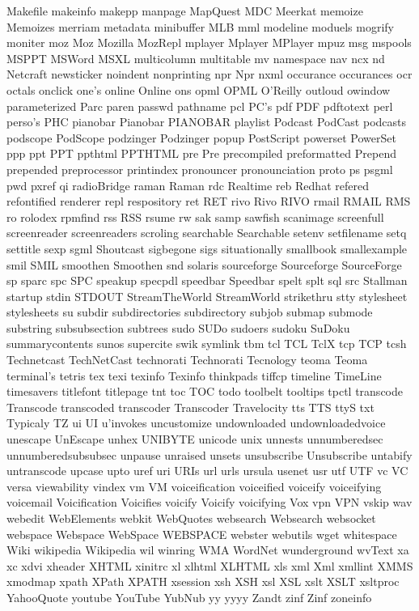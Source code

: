 Makefile
makeinfo
makepp
manpage
MapQuest
MDC
Meerkat
memoize
Memoizes
merriam
metadata
minibuffer
MLB
mml
modeline
moduels
mogrify
moniter
moz
Moz
Mozilla
MozRepl
mplayer
Mplayer
MPlayer
mpuz
msg
mspools
MSPPT
MSWord
MSXL
multicolumn
multitable
mv
namespace
nav
ncx
nd
Netcraft
newsticker
noindent
nonprinting
npr
Npr
nxml
occurance
occurances
ocr
octals
onclick
one's
online
Online
ons
opml
OPML
O'Reilly
outloud
owindow
parameterized
Parc
paren
passwd
pathname
pcl
PC's
pdf
PDF
pdftotext
perl
perso's
PHC
pianobar
Pianobar
PIANOBAR
playlist
Podcast
PodCast
podcasts
podscope
PodScope
podzinger
Podzinger
popup
PostScript
powerset
PowerSet
ppp
ppt
PPT
ppthtml
PPTHTML
pre
Pre
precompiled
preformatted
Prepend
prepended
preprocessor
printindex
pronouncer
pronounciation
proto
ps
psgml
pwd
pxref
qi
radioBridge
raman
Raman
rdc
Realtime
reb
Redhat
refered
refontified
renderer
repl
respository
ret
RET
rivo
Rivo
RIVO
rmail
RMAIL
RMS
ro
rolodex
rpmfind
rss
RSS
rsume
rw
sak
samp
sawfish
scanimage
screenfull
screenreader
screenreaders
scroling
searchable
Searchable
setenv
setfilename
setq
settitle
sexp
sgml
Shoutcast
sigbegone
sigs
situationally
smallbook
smallexample
smil
SMIL
smoothen
Smoothen
snd
solaris
sourceforge
Sourceforge
SourceForge
sp
sparc
spc
SPC
speakup
specpdl
speedbar
Speedbar
spelt
splt
sql
src
Stallman
startup
stdin
STDOUT
StreamTheWorld
StreamWorld
strikethru
stty
stylesheet
stylesheets
su
subdir
subdirectories
subdirectory
subjob
submap
submode
substring
subsubsection
subtrees
sudo
SUDo
sudoers
sudoku
SuDoku
summarycontents
sunos
supercite
swik
symlink
tbm
tcl
TCL
TclX
tcp
TCP
tcsh
Technetcast
TechNetCast
technorati
Technorati
Tecnology
teoma
Teoma
terminal's
tetris
tex
texi
texinfo
Texinfo
thinkpads
tiffcp
timeline
TimeLine
timesavers
titlefont
titlepage
tnt
toc
TOC
todo
toolbelt
tooltips
tpctl
transcode
Transcode
transcoded
transcoder
Transcoder
Travelocity
tts
TTS
ttyS
txt
Typicaly
TZ
ui
UI
u'invokes
uncustomize
undownloaded
undownloadedvoice
unescape
UnEscape
unhex
UNIBYTE
unicode
unix
unnests
unnumberedsec
unnumberedsubsubsec
unpause
unraised
unsets
unsubscribe
Unsubscribe
untabify
untranscode
upcase
upto
uref
uri
URIs
url
urls
ursula
usenet
usr
utf
UTF
vc
VC
versa
viewability
vindex
vm
VM
voiceification
voiceified
voiceify
voiceifying
voicemail
Voicification
Voicifies
voicify
Voicify
voicifying
Vox
vpn
VPN
vskip
wav
webedit
WebElements
webkit
WebQuotes
websearch
Websearch
websocket
webspace
Webspace
WebSpace
WEBSPACE
webster
webutils
wget
whitespace
Wiki
wikipedia
Wikipedia
wil
winring
WMA
WordNet
wunderground
wvText
xa
xc
xdvi
xheader
XHTML
xinitrc
xl
xlhtml
XLHTML
xls
xml
Xml
xmllint
XMMS
xmodmap
xpath
XPath
XPATH
xsession
xsh
XSH
xsl
XSL
xslt
XSLT
xsltproc
YahooQuote
youtube
YouTube
YubNub
yy
yyyy
Zandt
zinf
Zinf
zoneinfo
